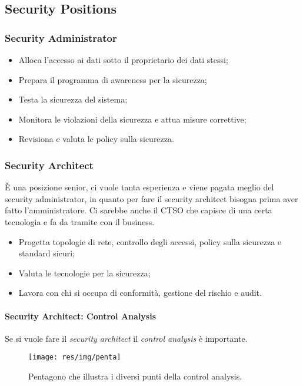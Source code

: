 \subsection{Security Positions}

\subsubsection{Security Administrator}

\begin{itemize}
\item Alloca l'accesso ai dati sotto il proprietario dei dati stessi;
\item Prepara il programma di awareness per la sicurezza;
\item Testa la sicurezza del sistema;
\item Monitora le violazioni della sicurezza e attua misure correttive;
\item Revisiona e valuta le policy sulla sicurezza.
\end{itemize}

\subsubsection{Security Architect}

È una posizione senior, ci vuole tanta esperienza e viene pagata meglio del 
security administrator, in quanto per fare il security architect bisogna 
prima aver fatto l'amministratore. 
Ci sarebbe anche il CTSO che capisce di una certa tecnologia e fa da tramite 
con il business.

\begin{itemize}
\item Progetta topologie di rete, controllo degli accessi, policy sulla sicurezza 
e standard sicuri;
\item Valuta le tecnologie per la sicurezza;
\item Lavora con chi si occupa di conformità, gestione del rischio e audit. 
\end{itemize}

\paragraph{Security Architect: Control Analysis}

Se si vuole fare il \textit{security architect} il \textit{control analysis} è 
importante.

\begin{figure}[h!]
        \begin{center}
                \texttt{[image: res/img/penta]}
        \end{center}
        \caption{Pentagono che illustra i diversi punti della control analysis.}
\end{figure}


